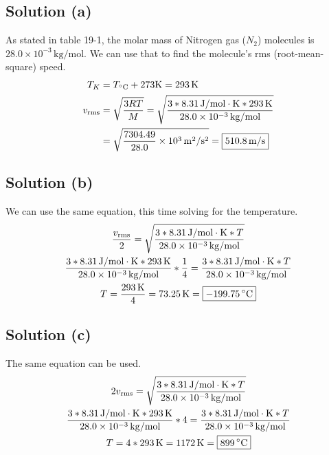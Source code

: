 \documentclass[12pt]{article}
\begin{document}
        \subsection{Solution (a)}
            As stated in table 19-1, the molar mass of Nitrogen gas ($N_2$) molecules is $28.0 \times 10^{-3}\,\unit{\kilo\gram/\mole}$. 
            We can use that to find the molecule's rms (root-mean-square) speed.
            \begin{align}
                T_{K}   &=  T_{\unit{\celsius}} + 273 \unit{\kelvin}
                    =   293\,\unit{\kelvin}\\
                v_{\rm rms} &=  \sqrt{\frac{3RT}{M}}
                    =   \sqrt{\frac{3 * 8.31\,\unit{\joule/\mole\cdot\kelvin} * 293\,\unit{\kelvin}}{28.0 \times 10^{-3}\,\unit{\kilo\gram/\mole}}}\\
                    &=  \sqrt{\frac{7304.49}{28.0} \times 10^{3}\,\unit{\meter^2/\second^2}}
                    =   \boxed{510.8\,\unit{\meter/\second}}
            \end{align}
        
        \subsection{Solution (b)}
            We can use the same equation, this time solving for the temperature.
            \begin{gather}
                \frac{v_{\rm rms}}{2}   =   \sqrt{\frac{3 * 8.31\,\unit{\joule/\mole\cdot\kelvin} * T}{28.0 \times 10^{-3}\,\unit{\kilo\gram/\mole}}}\\
                \frac{3 * 8.31\,\unit{\joule/\mole\cdot\kelvin} * 293\,\unit{\kelvin}}{28.0 \times 10^{-3}\,\unit{\kilo\gram/\mole}} * \frac{1}{4} =   \frac{3 * 8.31\,\unit{\joule/\mole\cdot\kelvin} * T}{28.0 \times 10^{-3}\,\unit{\kilo\gram/\mole}}\\
                T   =   \frac{293\,\unit{\kelvin}}{4}
                    =   73.25\,\unit{\kelvin}
                    =   \boxed{-199.75\,\unit{\celsius}}
            \end{gather}
        
        \subsection{Solution (c)}
            The same equation can be used.
            \begin{gather}
                2 v_{\rm rms}   =   \sqrt{\frac{3 * 8.31\,\unit{\joule/\mole\cdot\kelvin} * T}{28.0 \times 10^{-3}\,\unit{\kilo\gram/\mole}}}\\
                \frac{3 * 8.31\,\unit{\joule/\mole\cdot\kelvin} * 293\,\unit{\kelvin}}{28.0 \times 10^{-3}\,\unit{\kilo\gram/\mole}} * 4 =   \frac{3 * 8.31\,\unit{\joule/\mole\cdot\kelvin} * T}{28.0 \times 10^{-3}\,\unit{\kilo\gram/\mole}}\\
                T   =   4 * 293\,\unit{\kelvin} 
                    =   1172\,\unit{\kelvin}
                    =   \boxed{899\,\unit{\celsius}}
            \end{gather}
\end{document}

